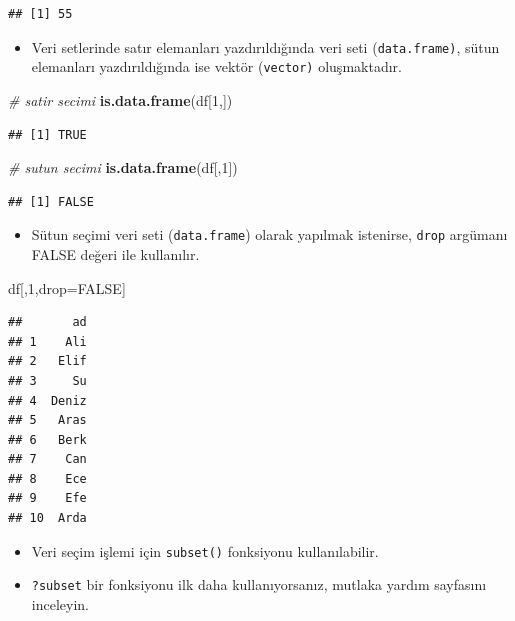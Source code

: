 \documentclass[
  oneside]{book}
\newenvironment{Shaded}{\begin{snugshade}}{\end{snugshade}}
\newcommand{\CommentTok}[1]{\textcolor[rgb]{0.56,0.35,0.01}{\textit{#1}}}
\newcommand{\ConstantTok}[1]{\textcolor[rgb]{0.56,0.35,0.01}{#1}}
\newcommand{\DecValTok}[1]{\textcolor[rgb]{0.00,0.00,0.81}{#1}}
\newcommand{\FunctionTok}[1]{\textcolor[rgb]{0.13,0.29,0.53}{\textbf{#1}}}
\newcommand{\NormalTok}[1]{#1}
\newcommand{\OtherTok}[1]{\textcolor[rgb]{0.56,0.35,0.01}{#1}}
\providecommand{\tightlist}{%
  \setlength{\itemsep}{0pt}\setlength{\parskip}{0pt}}
\begin{document}
\begin{verbatim}
## [1] 55
\end{verbatim}

\begin{itemize}
\tightlist
\item
  Veri setlerinde satır elemanları yazdırıldığında veri seti (\texttt{data.frame)}, sütun elemanları yazdırıldığında ise vektör (\texttt{vector)} oluşmaktadır.
\end{itemize}

\begin{Shaded}
\begin{Highlighting}[]
\CommentTok{\# satir secimi}
\FunctionTok{is.data.frame}\NormalTok{(df[}\DecValTok{1}\NormalTok{,])}
\end{Highlighting}
\end{Shaded}

\begin{verbatim}
## [1] TRUE
\end{verbatim}

\begin{Shaded}
\begin{Highlighting}[]
\CommentTok{\# sutun secimi}
\FunctionTok{is.data.frame}\NormalTok{(df[,}\DecValTok{1}\NormalTok{])}
\end{Highlighting}
\end{Shaded}

\begin{verbatim}
## [1] FALSE
\end{verbatim}

\begin{itemize}
\tightlist
\item
  Sütun seçimi veri seti (\texttt{data.frame}) olarak yapılmak istenirse, \texttt{drop} argümanı FALSE değeri ile kullanılır.
\end{itemize}

\begin{Shaded}
\begin{Highlighting}[]
\NormalTok{df[,}\DecValTok{1}\NormalTok{,drop}\OtherTok{=}\ConstantTok{FALSE}\NormalTok{]}
\end{Highlighting}
\end{Shaded}

\begin{verbatim}
##       ad
## 1    Ali
## 2   Elif
## 3     Su
## 4  Deniz
## 5   Aras
## 6   Berk
## 7    Can
## 8    Ece
## 9    Efe
## 10  Arda
\end{verbatim}

\begin{itemize}
\item
  Veri seçim işlemi için \texttt{subset()} fonksiyonu kullanılabilir.
\item
  \texttt{?subset} bir fonksiyonu ilk daha kullanıyorsanız, mutlaka yardım sayfasını inceleyin.
\end{itemize}
\end{document}

